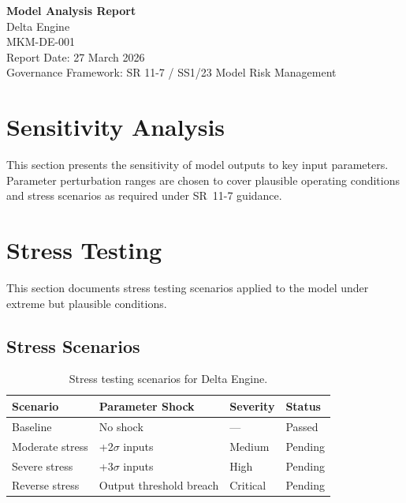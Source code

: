 \documentclass[11pt,a4paper]{article}
\begin{document}
\begin{center}
{\Large\textbf{Model Analysis Report}}\\[6pt]
{\large\textcolor{mkmblue}{Delta Engine}}\\[4pt]
{\normalsize MKM-DE-001}\\[12pt]
{\small Report Date: 27 March 2026}\\[4pt]
{\footnotesize Governance Framework: SR 11-7 / SS1/23 Model Risk Management}
\end{center}

\vspace{8mm}
\tableofcontents
\newpage

\section{Sensitivity Analysis}

This section presents the sensitivity of model outputs to key input parameters.
Parameter perturbation ranges are chosen to cover plausible operating conditions
and stress scenarios as required under SR~11-7 guidance.




\section{Stress Testing}

This section documents stress testing scenarios applied to the model
under extreme but plausible conditions.

\subsection{Stress Scenarios}

\begin{table}[H]
    \centering
    \caption{Stress testing scenarios for Delta Engine.}
    \begin{tabular}{llll}
        \toprule
        \textbf{Scenario} & \textbf{Parameter Shock} & \textbf{Severity} & \textbf{Status} \\
        \midrule
        Baseline & No shock & --- & Passed \\
        Moderate stress & +2$\sigma$ inputs & Medium & Pending \\
        Severe stress & +3$\sigma$ inputs & High & Pending \\
        Reverse stress & Output threshold breach & Critical & Pending \\
        \bottomrule
    \end{tabular}
\end{table}
\end{document}
